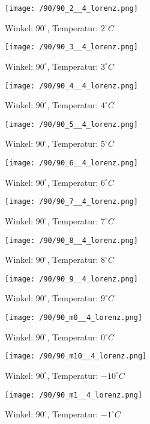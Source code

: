 \begin{figure}[c]
\centering
\texttt{[image: /90/90\_2\_\_4\_lorenz.png]}
\caption{Winkel: $ 90^\circ$, Temperatur: $ 2^\circ C$}
\end{figure}
\clearpage
\begin{figure}[c]
\centering
\texttt{[image: /90/90\_3\_\_4\_lorenz.png]}
\caption{Winkel: $ 90^\circ$, Temperatur: $ 3^\circ C$}
\end{figure}
\begin{figure}[c]
\centering
\texttt{[image: /90/90\_4\_\_4\_lorenz.png]}
\caption{Winkel: $ 90^\circ$, Temperatur: $ 4^\circ C$}
\end{figure}
\clearpage
\begin{figure}[c]
\centering
\texttt{[image: /90/90\_5\_\_4\_lorenz.png]}
\caption{Winkel: $ 90^\circ$, Temperatur: $ 5^\circ C$}
\end{figure}
\begin{figure}[c]
\centering
\texttt{[image: /90/90\_6\_\_4\_lorenz.png]}
\caption{Winkel: $ 90^\circ$, Temperatur: $ 6^\circ C$}
\end{figure}
\clearpage
\begin{figure}[c]
\centering
\texttt{[image: /90/90\_7\_\_4\_lorenz.png]}
\caption{Winkel: $ 90^\circ$, Temperatur: $ 7^\circ C$}
\end{figure}
\begin{figure}[c]
\centering
\texttt{[image: /90/90\_8\_\_4\_lorenz.png]}
\caption{Winkel: $ 90^\circ$, Temperatur: $ 8^\circ C$}
\end{figure}
\clearpage
\begin{figure}[c]
\centering
\texttt{[image: /90/90\_9\_\_4\_lorenz.png]}
\caption{Winkel: $ 90^\circ$, Temperatur: $ 9^\circ C$}
\end{figure}
\begin{figure}[c]
\centering
\texttt{[image: /90/90\_m0\_\_4\_lorenz.png]}
\caption{Winkel: $ 90^\circ$, Temperatur: $ 0^\circ C$}
\end{figure}
\clearpage
\begin{figure}[c]
\centering
\texttt{[image: /90/90\_m10\_\_4\_lorenz.png]}
\caption{Winkel: $ 90^\circ$, Temperatur: $ -10^\circ C$}
\end{figure}
\begin{figure}[c]
\centering
\texttt{[image: /90/90\_m1\_\_4\_lorenz.png]}
\caption{Winkel: $ 90^\circ$, Temperatur: $ -1^\circ C$}
\end{figure}
